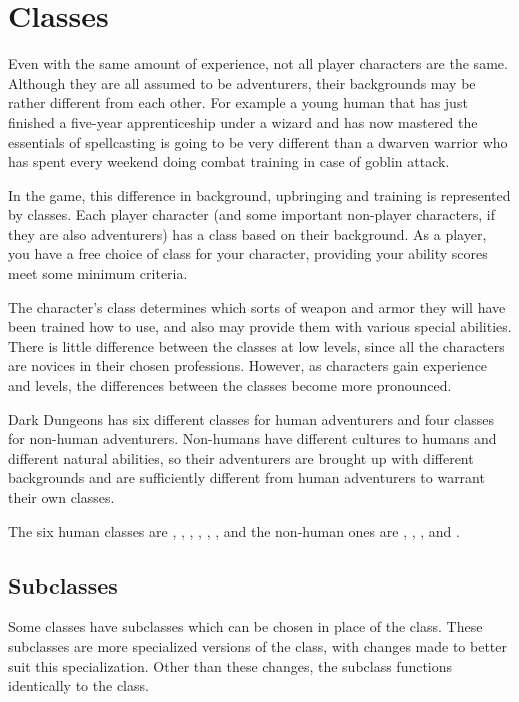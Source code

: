 \chapter[red]{Classes}
\label{chap:Classes}
\chapterimage
\thispagestyle{plain}

\begin{multicols*}{2}
Even with the same amount of experience, not all player characters are the same. Although they are all assumed to be adventurers, their backgrounds may be rather different from each other. For example a young human that has just finished a five-year apprenticeship under a wizard and has now mastered the essentials of spellcasting is going to be very different than a dwarven warrior who has spent every weekend doing combat training in case of goblin attack.

In the game, this difference in background, upbringing and training is represented by classes. Each player character (and some important non-player characters, if they are also adventurers) has a class based on their background. As a player, you have a free choice of class for your character, providing your ability scores meet some minimum criteria.

The character’s class determines which sorts of weapon and armor they will have been trained how to use, and also may provide them with various special abilities. There is little difference between the classes at low levels, since all the characters are novices in their chosen professions. However, as characters gain experience and levels, the differences between the classes become more pronounced.

Dark Dungeons has six different classes for human adventurers and four classes for non-human adventurers. Non-humans have different cultures to humans and different natural abilities, so their adventurers are brought up with different backgrounds and are sufficiently different from human adventurers to warrant their own classes.

The six human classes are , , , , , , and the non-human ones are , , , and .

\section{Subclasses}
Some classes have subclasses which can be chosen in place of the class. These subclasses are more specialized versions of the class, with changes made to better suit this specialization. Other than these changes, the subclass functions identically to the class.


\end{multicols*}
